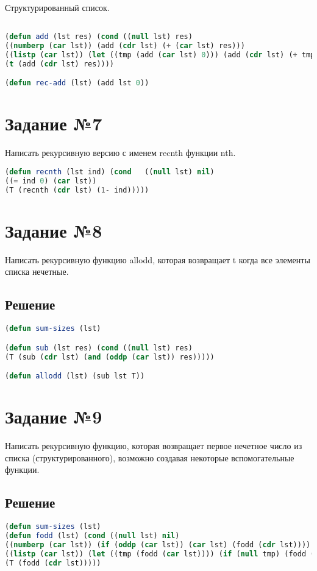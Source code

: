 Структурированный список.

\begin{lstlisting}[label=5,caption=Решение задания №5, language=lisp]

(defun add (lst res) (cond ((null lst) res) 
((numberp (car lst)) (add (cdr lst) (+ (car lst) res)))
((listp (car lst)) (let ((tmp (add (car lst) 0))) (add (cdr lst) (+ tmp res)) ))
(t (add (cdr lst) res))))

(defun rec-add (lst) (add lst 0))

\end{lstlisting}




\section*{Задание №7}
Написать рекурсивную версию с именем recnth функции nth.
\begin{lstlisting}[label=5,caption=Решение задания №5, language=lisp]
(defun recnth (lst ind) (cond   ((null lst) nil)
((= ind 0) (car lst))
(T (recnth (cdr lst) (1- ind)))))

\end{lstlisting}

\section*{Задание №8}
Написать рекурсивную функцию allodd, которая возвращает t когда все элементы списка
нечетные.
\subsection*{Решение}
\begin{lstlisting}[label=5,caption=Решение задания №5, language=lisp]
(defun sum-sizes (lst) 

(defun sub (lst res) (cond ((null lst) res)
(T (sub (cdr lst) (and (oddp (car lst)) res)))))

(defun allodd (lst) (sub lst T))

\end{lstlisting}	

\section*{Задание №9}
Написать рекурсивную функцию, которая возвращает первое нечетное число из списка
(структурированного), возможно создавая некоторые вспомогательные функции.
\subsection*{Решение}
\begin{lstlisting}[label=5,caption=Решение задания №5, language=lisp]
(defun sum-sizes (lst) 
(defun fodd (lst) (cond ((null lst) nil) 
((numberp (car lst)) (if (oddp (car lst)) (car lst) (fodd (cdr lst))))
((listp (car lst)) (let ((tmp (fodd (car lst)))) (if (null tmp) (fodd (cdr lst)) tmp)))
(T (fodd (cdr lst)))))

\end{lstlisting}	

